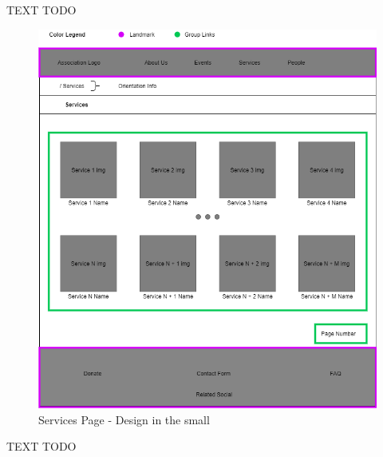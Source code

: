 TEXT TODO

\begin{figure}[h!]
		\centering
		\begin{minipage}[b]{1\textwidth}
    			\includegraphics[width=\textwidth]{./assets/services.png}
			\caption{Services Page - Design in the small}
		\end{minipage}
	\end{figure}
	\FloatBarrier


TEXT TODO

